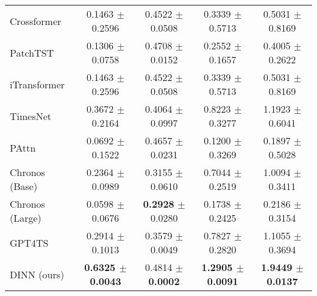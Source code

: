 {\begin{tabular}{lcccc}
Crossformer                          & 0.1463 $\pm$ 0.2596                                                    & 0.4522 $\pm$ 0.0508                                           & 0.3339 $\pm$ 0.5713                               & 0.5031 $\pm$ 0.8169                               \\
PatchTST                             & 0.1306 $\pm$ 0.0758                                                    & 0.4708 $\pm$ 0.0152                                           & 0.2552 $\pm$ 0.1657                               & 0.4005 $\pm$ 0.2622                               \\
iTransformer                         & 0.1463 $\pm$ 0.2596                                                    & 0.4522 $\pm$ 0.0508                                           & 0.3339 $\pm$ 0.5713                               & 0.5031 $\pm$ 0.8169                               \\
TimesNet                             & 0.3672 $\pm$ 0.2164                                                    & 0.4064 $\pm$ 0.0997                                           & 0.8223 $\pm$ 0.3277                               & 1.1923 $\pm$ 0.6041                               \\
PAttn                                & 0.0692 $\pm$ 0.1522                                                    & 0.4657 $\pm$ 0.0231                                           & 0.1200 $\pm$ 0.3269                               & 0.1897 $\pm$ 0.5028                               \\
Chronos (Base)                       & 0.2364 $\pm$ 0.0989                                                    & 0.3155 $\pm$ 0.0610                                           & 0.7044 $\pm$ 0.2519                               & 1.0094 $\pm$ 0.3411                               \\
Chronos (Large)                      & 0.0598 $\pm$ 0.0676                                                    & \textbf{0.2928} $\pm$ 0.0280                                  & 0.1738 $\pm$ 0.2425                               & 0.2186 $\pm$ 0.3154                               \\
GPT4TS                               & 0.2914 $\pm$ 0.1013                                                    & 0.3579 $\pm$ 0.0049                                           & 0.7827 $\pm$ 0.2820                               & 1.1055 $\pm$ 0.3694                               \\
DINN (ours)                          & \textbf{0.6325 $\pm$ \color[HTML]{00009B} 0.0043}                      & 0.4814 $\pm$ \textbf{\color[HTML]{00009B} 0.0002}                      & \textbf{1.2905 $\pm$ \color[HTML]{00009B} 0.0091} & \textbf{1.9449 $\pm$ \color[HTML]{00009B} 0.0137} \\ \hline

\end{tabular}}

